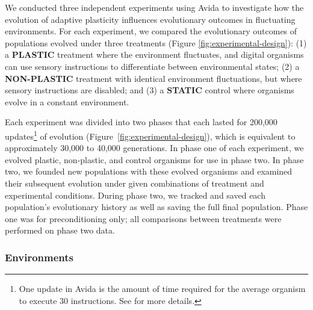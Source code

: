 \begin{raggedbottom}

We conducted three independent experiments using Avida to investigate how the evolution of adaptive plasticity influences evolutionary outcomes in fluctuating environments.
For each experiment, we compared the evolutionary outcomes of populations evolved under three treatments (Figure \ref{fig:experimental-design}):
(1) a \textbf{PLASTIC} treatment where the environment fluctuates, and digital organisms can use sensory instructions to differentiate between environmental states;
(2) a \textbf{NON-PLASTIC} treatment with identical environment fluctuations, but where sensory instructions are disabled;
and (3) a \textbf{STATIC} control where organisms evolve in a constant environment.

Each experiment was divided into two phases that each lasted for 200,000 updates\footnote{
    One update in Avida is the amount of time required for the average organism to execute 30 instructions.
    See \citep{ofria_avida:_2009} for more details.
} of evolution (Figure~\ref{fig:experimental-design}), which is equivalent to approximately 30,000 to 40,000 generations.
In phase one of each experiment, we evolved plastic, non-plastic, and control organisms for use in phase two.
In phase two, we founded new populations with these evolved organisms and examined their subsequent evolution under given combinations of treatment and experimental conditions.
During phase two, we tracked and saved each population's evolutionary history as well as saving the full final population.
Phase one was for preconditioning only; all comparisons between treatments were performed on phase two data.

\subsubsection{Environments}
\label{sec:methods:experiment:environments}



\end{raggedbottom}
